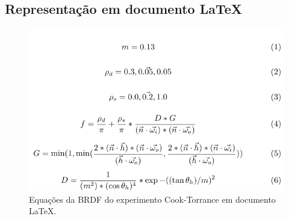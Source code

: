 \subsection{Representação em documento \LaTeX{}}
\begin{figure}[H]
    \caption{\label{fig-cook-torrance-eqlang-latex} \small Equações da BRDF do experimento Cook-Torrance em documento \LaTeX{}.}
    \begin{center}
        \includegraphics[scale=0.92]{./Imagens/brdfs/cook-torrance.pdf}
    \end{center}
\end{figure}

